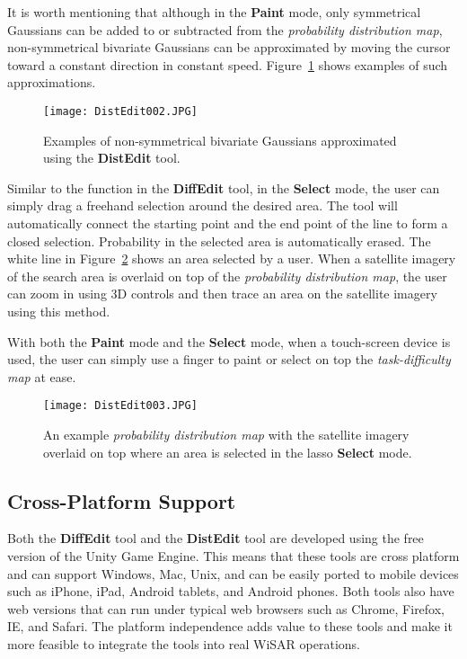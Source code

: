 It is worth mentioning that although in the \textbf{Paint} mode, only symmetrical Gaussians can be added to or subtracted from the \textit{probability distribution map}, non-symmetrical bivariate Gaussians can be approximated by moving the cursor toward a constant direction in constant speed. Figure~\ref{DistEdit002} shows examples of such approximations.

\begin{figure}[!ht]
\centering
\texttt{[image: DistEdit002.JPG]}
\caption{Examples of non-symmetrical bivariate Gaussians approximated using the \textbf{DistEdit} tool.}
\label{DistEdit002}
\end{figure}

Similar to the function in the \textbf{DiffEdit} tool, in the \textbf{Select} mode, the user can simply drag a freehand selection around the desired area. The tool will automatically connect the starting point and the end point of the line to form a closed selection. Probability in the selected area is automatically erased. The white line in Figure~\ref{DistEdit003} shows an area selected by a user. When a satellite imagery of the search area is overlaid on top of the \textit{probability distribution map}, the user can zoom in using 3D controls and then trace an area on the satellite imagery using this method.

With both the \textbf{Paint} mode and the \textbf{Select} mode, when a touch-screen device is used, the user can simply use a finger to paint or select on top the \textit{task-difficulty map} at ease.

\begin{figure}[!ht]
\centering
\texttt{[image: DistEdit003.JPG]}
\caption{An example \textit{probability distribution map} with the satellite imagery overlaid on top where an area is selected in the lasso \textbf{Select} mode.}
\label{DistEdit003}
\end{figure}

\subsection{Cross-Platform Support}

Both the \textbf{DiffEdit} tool and the \textbf{DistEdit} tool are developed using the free version of the Unity Game Engine. This means that these tools are cross platform and can support Windows, Mac, Unix, and can be easily ported to mobile devices such as iPhone, iPad, Android tablets, and Android phones. Both tools also have web versions that can run under typical web browsers such as Chrome, Firefox, IE, and Safari. The platform independence adds value to these tools and make it more feasible to integrate the tools into real WiSAR operations.